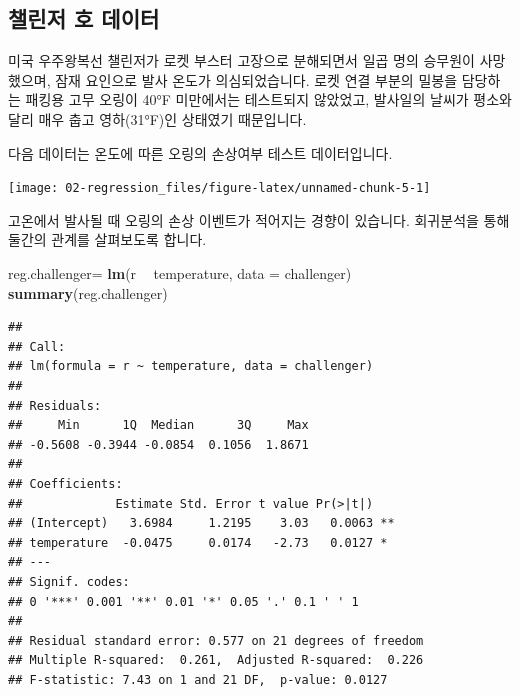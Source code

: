 \documentclass[12pt,]{book}
\newenvironment{Shaded}{\begin{snugshade}}{\end{snugshade}}
\newcommand{\DataTypeTok}[1]{\textcolor[rgb]{0.13,0.29,0.53}{#1}}
\newcommand{\DecValTok}[1]{\textcolor[rgb]{0.00,0.00,0.81}{#1}}
\newcommand{\KeywordTok}[1]{\textcolor[rgb]{0.13,0.29,0.53}{\textbf{#1}}}
\newcommand{\NormalTok}[1]{#1}
\newcommand{\OperatorTok}[1]{\textcolor[rgb]{0.81,0.36,0.00}{\textbf{#1}}}
\newcommand{\StringTok}[1]{\textcolor[rgb]{0.31,0.60,0.02}{#1}}
\begin{document}
\hypertarget{uxcc4cuxb9b0uxc800-uxd638-uxb370uxc774uxd130}{%
\subsection{챌린저 호 데이터}\label{uxcc4cuxb9b0uxc800-uxd638-uxb370uxc774uxd130}}

미국 우주왕복선 챌린저가 로켓 부스터 고장으로 분해되면서 일곱 명의 승무원이 사망했으며, 잠재 요인으로 발사 온도가 의심되었습니다. 로켓 연결 부분의 밀봉을 담당하는 패킹용 고무 오링이 40°F 미만에서는 테스트되지 않았었고, 발사일의 날씨가 평소와 달리 매우 춥고 영하(31°F)인 상태였기 때문입니다.

다음 데이터는 온도에 따른 오링의 손상여부 테스트 데이터입니다.

\begin{Shaded}
\end{Shaded}

\begin{center}\texttt{[image: 02-regression\_files/figure-latex/unnamed-chunk-5-1]} \end{center}

고온에서 발사될 때 오링의 손상 이벤트가 적어지는 경향이 있습니다. 회귀분석을 통해 둘간의 관계를 살펴보도록 합니다.

\begin{Shaded}
\begin{Highlighting}[]
\NormalTok{reg.challenger=}\StringTok{ }\KeywordTok{lm}\NormalTok{(r }\OperatorTok{~}\StringTok{ }\NormalTok{temperature, }\DataTypeTok{data =}\NormalTok{ challenger)}
\KeywordTok{summary}\NormalTok{(reg.challenger)}
\end{Highlighting}
\end{Shaded}

\begin{verbatim}
## 
## Call:
## lm(formula = r ~ temperature, data = challenger)
## 
## Residuals:
##     Min      1Q  Median      3Q     Max 
## -0.5608 -0.3944 -0.0854  0.1056  1.8671 
## 
## Coefficients:
##             Estimate Std. Error t value Pr(>|t|)   
## (Intercept)   3.6984     1.2195    3.03   0.0063 **
## temperature  -0.0475     0.0174   -2.73   0.0127 * 
## ---
## Signif. codes:  
## 0 '***' 0.001 '**' 0.01 '*' 0.05 '.' 0.1 ' ' 1
## 
## Residual standard error: 0.577 on 21 degrees of freedom
## Multiple R-squared:  0.261,  Adjusted R-squared:  0.226 
## F-statistic: 7.43 on 1 and 21 DF,  p-value: 0.0127
\end{verbatim}
\end{document}
